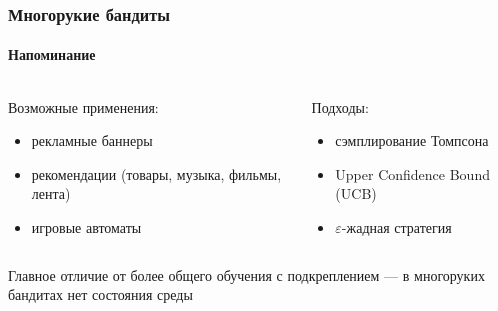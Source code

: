 \documentclass[fullscreen=true, bookmarks=true, hyperref={pdfencoding=unicode}]{beamer}
\begin{document}
\begin{frame}
  \frametitle{Многорукие бандиты}
  \framesubtitle{Напоминание}

  \begin{columns}
    \begin{column}{.4\paperwidth}
      Возможные применения:
      \begin{itemize}
        \item рекламные баннеры
        \item рекомендации (товары, музыка, фильмы, лента)
        \item игровые автоматы
      \end{itemize}
    \end{column}
    \begin{column}{.4\paperwidth}
      Подходы:
      \begin{itemize}
        \item сэмплирование Томпсона
        \item Upper Confidence Bound (UCB)
        \item $\varepsilon$-жадная стратегия
      \end{itemize}
    \end{column}
  \end{columns}

  \vspace{1cm}
  Главное отличие от более общего обучения с подкреплением — в многоруких бандитах нет состояния среды

\end{frame}
\end{document}

